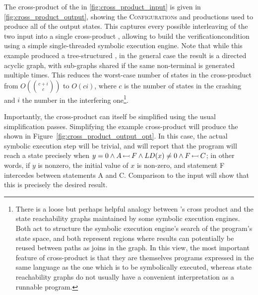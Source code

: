 The cross-product of the {\StateMachines} in
\autoref{fig:cross_product_input} is given in
\autoref{fig:cross_product_output}, showing the
\textsc{Configuration}s and productions used to produce all of the
output states.  This captures every possible interleaving of the two
input {\StateMachines} into a single cross-product {\StateMachine},
allowing {\technique} to build the \gls{verificationcondition} using a
simple single-threaded symbolic execution engine.  Note that while
this example produced a tree-structured {\StateMachine}, in the
general case the result is a directed acyclic graph, with sub-graphs
shared if the same non-terminal is generated multiple times.  This
reduces the worst-case number of states in the cross-product
{\StateMachine} from $O(\binom{c+i}{c})$ to $O(ci)$, where $c$ is the
number of states in the crashing {\StateMachine} and $i$ the number in
the interfering one\footnote{There is a loose but perhaps helpful
  analogy between {\technique}'s cross product {\StateMachines} and
  the state reachability graphs maintained by some symbolic execution
  engines.  Both act to structure the symbolic execution engine's
  search of the program's state space, and both represent regions
  where results can potentially be reused between paths as joins in
  the graph.  In this view, the most important feature of
  cross-product {\StateMachines} is that they are themselves programs
  expressed in the same language as the one which is to be
  symbolically executed, whereas state reachability graphs do not
  usually have a convenient interpretation as a runnable
  program.}\!\hspace{-.1em}\!.

Importantly, the cross-product {\StateMachine} can itself be
simplified using the usual {\StateMachine} simplification passes.
Simplifying the example cross-product {\StateMachine} will produce the
{\StateMachine} shown in Figure~\ref{fig:cross_product_output_opt}.
In this case, the actual symbolic execution step will be trivial, and
will report that the program will reach a {\stCrash} state precisely
when $y = 0 \wedge A\,{\leftarrowtail}\,F \wedge LD(x) \not= 0 \wedge
F\,{\leftarrowtail}\,C$; in other words, if $y$ is nonzero, the initial
value of $x$ is non-zero, and statement F intercedes between
statements A and C.  Comparison to the input {\StateMachines} will
show that this is precisely the desired result.

